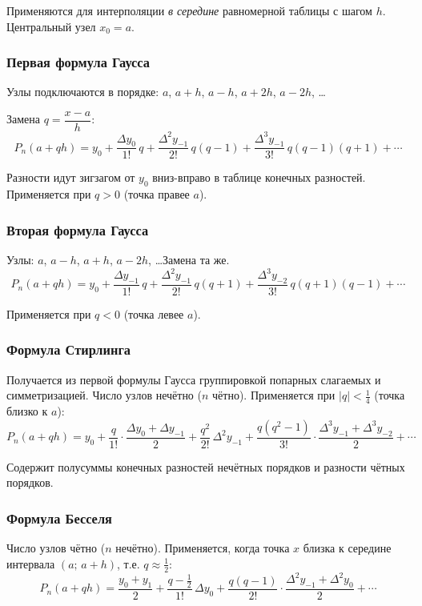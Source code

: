 Применяются для интерполяции \textit{в середине} равномерной таблицы с шагом $h$. Центральный узел $x_0 = a$.

\subsubsection*{Первая формула Гаусса}

Узлы подключаются в порядке: $a$, $a+h$, $a-h$, $a+2h$, $a-2h$, \ldots

Замена $q = \dfrac{x - a}{h}$:
\[
    P_n(a + qh) = y_0 + \frac{\Delta y_0}{1!}\,q + \frac{\Delta^2 y_{-1}}{2!}\,q(q-1) + \frac{\Delta^3 y_{-1}}{3!}\,q(q-1)(q+1) + \cdots
\]

Разности идут зигзагом от $y_0$ вниз-вправо в таблице конечных разностей. Применяется при $q > 0$ (точка правее $a$).

\subsubsection*{Вторая формула Гаусса}

Узлы: $a$, $a-h$, $a+h$, $a-2h$, \ldots Замена та же.
\[
    P_n(a + qh) = y_0 + \frac{\Delta y_{-1}}{1!}\,q + \frac{\Delta^2 y_{-1}}{2!}\,q(q+1) + \frac{\Delta^3 y_{-2}}{3!}\,q(q+1)(q-1) + \cdots
\]

Применяется при $q < 0$ (точка левее $a$).

\subsubsection*{Формула Стирлинга}

Получается из первой формулы Гаусса группировкой попарных слагаемых и симметризацией. Число узлов нечётно ($n$ чётно). Применяется при $|q| < \frac{1}{4}$ (точка близко к $a$):
\[
    P_n(a + qh) = y_0 + \frac{q}{1!} \cdot \frac{\Delta y_0 + \Delta y_{-1}}{2} + \frac{q^2}{2!}\,\Delta^2 y_{-1} + \frac{q(q^2 - 1)}{3!} \cdot \frac{\Delta^3 y_{-1} + \Delta^3 y_{-2}}{2} + \cdots
\]

Содержит полусуммы конечных разностей нечётных порядков и разности чётных порядков.

\subsubsection*{Формула Бесселя}

Число узлов чётно ($n$ нечётно). Применяется, когда точка $x$ близка к середине интервала $(a;\, a+h)$, т.е. $q \approx \frac{1}{2}$:
\[
    P_n(a + qh) = \frac{y_0 + y_1}{2} + \frac{q - \frac{1}{2}}{1!}\,\Delta y_0 + \frac{q(q-1)}{2!} \cdot \frac{\Delta^2 y_{-1} + \Delta^2 y_0}{2} + \cdots
\]

